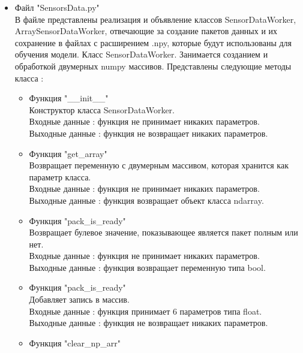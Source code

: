 \documentclass[a4document]{article}
\begin{document}
{\begin{itemize}
\begin{itemize}
        \end{itemize}
    
    \item Файл "SensorsData.py" \\ 
        В файле представлены реализация и объявление классов SensorDataWorker, ArraySensorDataWorker, отвечающие за
        создание пакетов данных и их сохранение в файлах с расширением .npy, которые будут использованы для обучения модели.
        \bigbreak
        Класс SensorDataWorker.
        Занимается созданием и обработкой двумерных numpy массивов.
        Представлены следующие методы класса :
        
        \begin{itemize}
            \item Функция "\_\_init\_\_" \\
                Конструктор класса SensorDataWorker.\\
                Входные данные : функция не принимает никаких параметров. \\ 
                Выходные данные : функция не возвращает никаких параметров.
            \item Функция "get\_array" \\
                Возвращает переменную с двумерным массивом, которая хранится как параметр класса.\\
                Входные данные : функция не принимает никаких параметров. \\ 
                Выходные данные : функция возвращает объект класса ndarray.
            \item Функция "pack\_is\_ready" \\
                Возвращает булевое значение, показывающее является пакет полным или нет.\\
                Входные данные : функция не принимает никаких параметров. \\ 
                Выходные данные : функция возвращает переменную типа bool.
            \item Функция "pack\_is\_ready" \\
                Добавляет запись в массив.\\
                Входные данные : функция принимает 6 параметров типа float. \\ 
                Выходные данные : функция не возвращает никаких параметров.
            \newpage
            \item Функция "clear\_np\_arr" \\

\end{itemize}
\end{itemize}}
\end{document}
